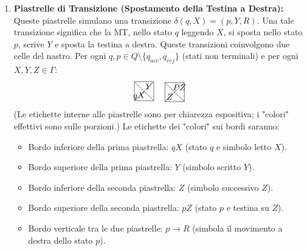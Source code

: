 \documentclass[a4paper]{article}
\begin{document}
\begin{enumerate}
    \item \textbf{Piastrelle di Transizione (Spostamento della Testina a Destra):}
    Queste piastrelle simulano una transizione $\delta(q, X) = (p, Y, R)$. Una tale transizione significa che la MT, nello stato $q$ leggendo $X$, si sposta nello stato $p$, scrive $Y$ e sposta la testina a destra.
    Queste transizioni coinvolgono due celle del nastro.
    Per ogni $q, p \in Q \setminus \{q_{acc}, q_{rej}\}$ (stati non terminali) e per ogni $X, Y, Z \in \Gamma$:
    \[
    \begin{tikzpicture}[scale=0.8]
    \draw (0,0) -- (1,0) -- (1,1) -- (0,1) -- cycle;
    \draw (0,0) -- (1,1);
    \draw (1,0) -- (0,1);
    \node at (0.25, 0.75) {}; %
    \node at (0.75, 0.75) {$Y$}; %
    \node at (0.25, 0.25) {$qX$}; %
    \node at (0.75, 0.25) {}; %
    \end{tikzpicture}
    \quad
    \begin{tikzpicture}[scale=0.8]
    \draw (0,0) -- (1,0) -- (1,1) -- (0,1) -- cycle;
    \draw (0,0) -- (1,1);
    \draw (1,0) -- (0,1);
    \node at (0.25, 0.75) {}; %
    \node at (0.75, 0.75) {$PZ$}; %
    \node at (0.25, 0.25) {$Z$}; %
    \node at (0.75, 0.25) {}; %
    \end{tikzpicture}
    \]
    (Le etichette interne alle piastrelle sono per chiarezza espositiva; i "colori" effettivi sono sulle porzioni.)
    Le etichette dei "colori" sui bordi saranno:
    \begin{itemize}
        \item Bordo inferiore della prima piastrella: $qX$ (stato $q$ e simbolo letto $X$).
        \item Bordo superiore della prima piastrella: $Y$ (simbolo scritto $Y$).
        \item Bordo inferiore della seconda piastrella: $Z$ (simbolo successivo $Z$).
        \item Bordo superiore della seconda piastrella: $pZ$ (stato $p$ e testina su $Z$).
        \item Bordo verticale tra le due piastrelle: $p \to R$ (simbola il movimento a destra dello stato $p$).
    \end{itemize}


\end{enumerate}
\end{document}
